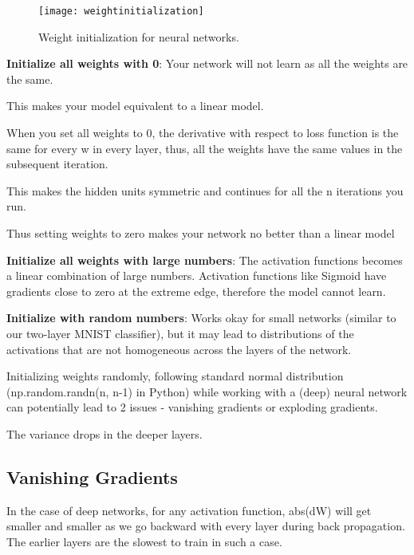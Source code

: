  	\begin{figure}[h]
		\centering
		\texttt{[image: weightinitialization]}
		\caption[Weight initialization for neural networks]{Weight initialization for neural networks.}
		\label{fig:weightinitialization}
	\end{figure}

	\begin{bulletedlist}
		\item {\bfseries Initialize all weights with 0}:  Your network will not learn as all the weights are the same.
		\begin{bulletedlist}
			\item This makes your model equivalent to a linear model.
			\item When you set all weights to 0, the derivative with respect to loss function is the same for every w in every layer, thus, all the weights have the same values in the subsequent iteration.
			\item This makes the hidden units symmetric and continues for all the n iterations you run.
			\item Thus setting weights to zero makes your network no better than a linear model
		\end{bulletedlist}
		\item {\bfseries Initialize all weights with large numbers}:  The activation functions becomes a linear combination of large numbers.  Activation functions like Sigmoid have gradients close to zero at the extreme edge, therefore the model cannot learn.
		\item {\bfseries Initialize with random numbers}: Works okay for small networks (similar to our two-layer MNIST classifier), but it may lead to distributions of the activations that are not homogeneous across the layers of the network.
		\begin{bulletedlist}
			\item Initializing weights randomly, following standard normal distribution (np.random.randn(n, n-1) in Python) while working with a (deep) neural network can potentially lead to 2 issues - vanishing gradients or exploding gradients.
			\item The variance drops in the deeper layers.
		\end{bulletedlist}
	\end{bulletedlist}

	\subsection{Vanishing Gradients}
In the case of deep networks, for any activation function, abs(dW) will get smaller and smaller as we go backward with every layer during back propagation.  The earlier layers are the
slowest to train in such a case.

